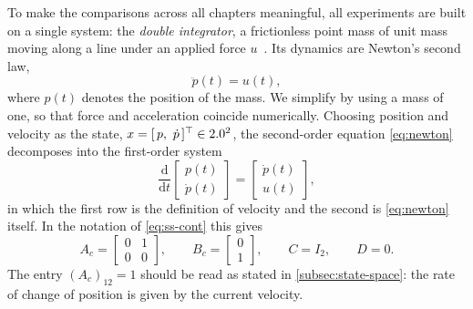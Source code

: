 To make the comparisons across all chapters
meaningful, all experiments are built on a single system: the
\emph{double integrator}, a frictionless point mass of unit mass moving along a
line under an applied force $u$~\cite[pp.~87--88]{Rao2001Naive}. Its dynamics are Newton's second law,
\begin{equation}
    \label{eq:newton}
    \ddot{p}(t) = u(t),
\end{equation}
where $p(t)$ denotes the position of the mass. We simplify by using a mass of one, so that
force and acceleration coincide numerically. Choosing position and velocity as
the state, $x = [\,p,\ \dot{p}\,]\T \in \R^{2}$, the second-order equation
\eqref{eq:newton} decomposes into the first-order system
\begin{equation}
    \label{eq:di-first-order}
    \frac{\mathrm{d}}{\mathrm{d}t} \begin{bmatrix} p(t) \\ \dot{p}(t) \end{bmatrix}
    = \begin{bmatrix} \dot{p}(t) \\ u(t) \end{bmatrix},
\end{equation}
in which the first row is the definition of velocity and the second is
\eqref{eq:newton} itself. In the notation of \eqref{eq:ss-cont} this gives
\begin{equation}
    \label{eq:di-cont-matrices}
    A_c = \begin{bmatrix} 0 & 1 \\ 0 & 0 \end{bmatrix},
    \qquad
    B_c = \begin{bmatrix} 0 \\ 1 \end{bmatrix},
    \qquad
    C = I_2, \qquad D = 0 .
\end{equation}
The entry $(A_c)_{12} = 1$ should be read as stated in \cref{subsec:state-space}:
the rate of change of position is given by the current velocity.
 
